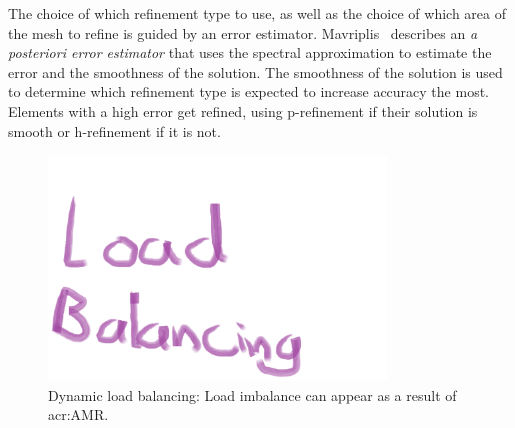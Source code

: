 The choice of which refinement type to use, as well as the choice of which area of the mesh to
refine is guided by an error estimator. Mavriplis~\cite{Mavriplis1990} describes an \textit{a
posteriori error estimator} that uses the spectral approximation to estimate the error and the
smoothness of the solution. The smoothness of the solution is used to determine which refinement
type is expected to increase accuracy the most. Elements with a high error get refined, using
p-refinement if their solution is smooth or h-refinement if it is not.


\begin{figure}[H]
	\centering
	\includegraphics[width=0.8\textwidth]{Chapter_introduction/media/dynamic_load_balancing}
	\caption{Dynamic load balancing: Load imbalance can appear as a result of \acrshort{acr:AMR}.}\label{fig:intro_load_balancing}
\end{figure}

